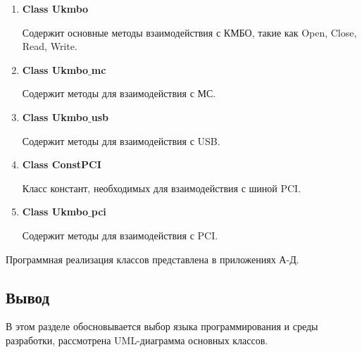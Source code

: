 \begin{enumerate}
		\item \textbf{Class Ukmbo}
		
		Содержит основные методы взаимодействия с КМБО, такие как Open, Close, Read, Write.
		
		\item \textbf{Class Ukmbo$\_$mc}
		
		Содержит методы для взаимодействия с МС.
		
		\item \textbf{Class Ukmbo$\_$usb}
		
		Содержит методы для взаимодействия с USB.
		
		\item \textbf{Class ConstPCI}
		
		Класс констант, необходимых для взаимодействия с шиной PCI.
		
		\item \textbf{Class Ukmbo$\_$pci}
		
		Содержит методы для взаимодействия с PCI.
	\end{enumerate}

		Программная реализация классов представлена в приложениях А-Д.
		
	\subsection{Вывод}
	В этом разделе обосновывается выбор языка программирования и среды разработки, рассмотрена UML-диаграмма основных классов.


